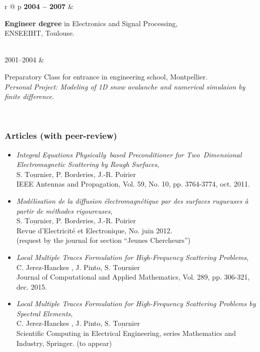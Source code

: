 \documentclass[a4paper,10pt,twoside]{article}
\newcommand{\categorie}[1]{\vspace*{0.1cm}\noindent%
	{\center  \colorbox[gray]{0.9}{\makebox[\textwidth][c]{\Large
              \sc {#1}}}\par}\vspace*{.5cm}}
\newlength{\texte}
\newlength{\textelarge}
\newcommand\moi{$\underline{\textrm{S. Tournier}}$}
\begin{document}
\begin{tabular}{r @{\qquad} p{\textelarge}}
  \textbf{2004 -- 2007} &
  \begin{minipage}[t]{\linewidth}
    \textbf{Engineer degree} in Electronics and Signal Processing,\\
    ENSEEIHT, Toulouse. \\
  \end{minipage} \\

  2001--2004 &
  \begin{minipage}[t]{\linewidth}
    Preparatory Class for entrance in engineering school, Montpellier. \\
    \small{\emph{Personal Project: Modeling of 1D snow avalanche and
        numerical simulaion by finite difference}}.
  \end{minipage} \\

\end{tabular}


\medskip

\categorie{Publications}
\subsubsection*{Articles (with peer-review)}

\begin{itemize}
\item[\textbullet]
\emph{Integral Equations Physically~based Preconditioner for Two~Dimensional Electromagnetic Scattering by Rough Surfaces}, \\
 \moi , P. Borderies, J.-R. Poirier \\
\textsf{IEEE Antennas and Propagation},
Vol. 59, No. 10, pp. 3764-3774, oct. 2011. \\[-1ex]
\item[\textbullet]
\emph{Modélisation de la diffusion électromagnétique par des surfaces
  rugueuses à partir de méthodes rigoureuses},\\
\moi , P. Borderies, J.-R. Poirier \\
\textsf{R}evue d'\textsf{E}lectricité et \textsf{E}lectronique,
No. juin 2012.\\
(request by the journal for section ``Jeunes Chercheurs'')
\item[\textbullet]
\emph{Local Multiple Traces Formulation for High-Frequency Scattering Problems},\\
 C. Jerez-Hanckes , J. Pinto, \moi \\
 \textsf{Journal of Computational and Applied Mathematics},
 Vol. 289, pp. 306-321, dec. 2015. %
\item[\textbullet]
 \emph{Local Multiple Traces Formulation for High-Frequency Scattering
   Problems by Spectral Elements},\\
 C. Jerez-Hanckes , J. Pinto, \moi \\
\textsf{Scientific Computing in Electrical Engineering}, series
Mathematics and Industry, Springer. (to appear)
\end{itemize}
\end{document}
